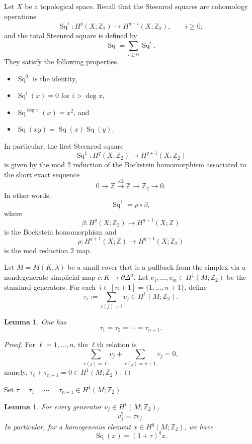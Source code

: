 \documentclass{amsart}
\newcommand{\Z}{\mathbb{Z}}
\DeclareMathOperator{\Sq}{Sq}
\theoremstyle{plain}
\newtheorem{lemma}[theorem]{Lemma}
\numberwithin{equation}{section}
\theoremstyle{definition}
\theoremstyle{remark}
\begin{document}
Let $X$ be a topological space.
Recall that the Steenrod squares are cohomology operations
\[
\Sq^i \colon H^q(X;\Z_2) \longrightarrow H^{q+i}(X;\Z_2), \qquad i \ge 0,
\]
and the total Steenrod square is defined by
\[
\Sq = \sum_{i \ge 0} \Sq^i.
\]
They satisfy the following properties.
\begin{itemize}
  \item $\Sq^0$ is the identity,
  \item $\Sq^i(x) = 0$ for $i > \deg x$,
  \item $\Sq^{\deg x}(x) = x^2$, and
  \item $\Sq(xy) = \Sq(x)\Sq(y)$.
\end{itemize}
In particular, the first Steenrod square
\[
\Sq^1\colon H^q(X;\Z_2)\longrightarrow H^{q+1}(X;\Z_2)
\]
is given by the mod $2$ reduction of the Bockstein homomorphism associated to the
short exact sequence
\begin{equation} \label{eq:ses}
    0\longrightarrow \Z \xrightarrow{\times 2} \Z \longrightarrow \Z_2 \longrightarrow 0.  
\end{equation}
In other words,
\[
\Sq^1=\rho\circ\beta,
\]
where
\[
\beta\colon H^q(X;\Z_2)\longrightarrow H^{q+1}(X;\Z)
\]
is the Bockstein homomorphism and
\[
\rho\colon H^{q+1}(X;\Z)\longrightarrow H^{q+1}(X;\Z_2)
\]
is the mod reduction $2$ map.

Let $M = M(K,\lambda)$ be a small cover that is a pullback from the simplex via a nondegenerate simplicial map $c \colon K\longrightarrow \partial\Delta^n$.
Let $v_1,\ldots,v_m \in H^1(M;\Z_2)$ be the standard generators.
For each~$i\in [n+1] = \{1,\ldots,n+1\}$, define
\[
\tau_i:=\sum_{c(j) = i} v_j \in H^1(M;\Z_2).
\]

\begin{lemma}\label{lem:tau_equal_RT}
    One has
    $$
        \tau_1=\tau_2=\cdots=\tau_{n+1}.
    $$
\end{lemma}

\begin{proof}
    For $\ell =1, \ldots, n$, the $\ell$th relation is 
    $$
        \sum_{c(j)=\ell}v_j+\sum_{c(j)=n+1}v_j=0,
    $$
    namely, $\tau_\ell+\tau_{n+1}=0 \in H^1(M;\Z_2)$.
\end{proof}

Set $\tau = \tau_1 = \cdots = \tau_{n+1} \in H^1(M;\Z_2)$.

\begin{lemma}\label{lem:square_generator_RT}    
    For every generator $v_j\in H^1(M;\Z_2)$,
    $$
    v_j^2=\tau v_j.
    $$
    In particular, for a homogeneous element $x \in  H^q(M;\Z_2)$, we have
    $$
        \Sq(x)=(1+ \tau)^q x.
    $$
\end{lemma}
\end{document}
